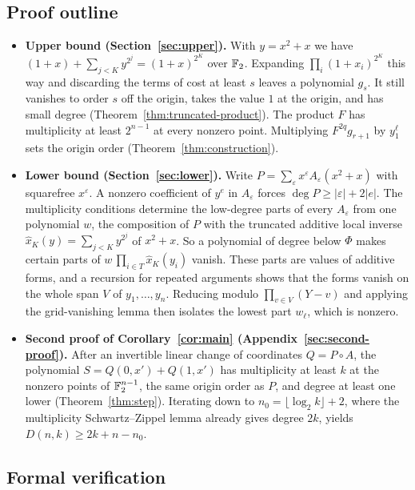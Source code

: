 \subsection{Proof outline}

\begin{itemize}
 \item \textbf{Upper bound (Section~\ref{sec:upper}).} With
 \(y=x^2+x\) we have \((1+x)+\sum_{j<K}y^{2^j}=(1+x)^{2^K}\) over \(\mathbb F_2\).
 Expanding \(\prod_i(1+x_i)^{2^K}\) this way and discarding the terms of
 cost at least \(s\) leaves a polynomial \(g_s\). It still vanishes to order
 \(s\) off the origin, takes the value \(1\) at the origin, and has small
 degree (Theorem~\ref{thm:truncated-product}). The product \(F\) has
 multiplicity at least \(2^{n-1}\) at every nonzero point. Multiplying
 \(F^{2q}g_{r+1}\) by \(y_1^\ell\) sets the origin order
 (Theorem~\ref{thm:construction}).
 \item \textbf{Lower bound (Section~\ref{sec:lower}).} Write
 \(P=\sum_\varepsilon x^\varepsilon A_\varepsilon(x^2+x)\) with squarefree
 \(x^\varepsilon\). A nonzero coefficient of \(y^e\) in \(A_\varepsilon\) forces
 \(\deg P\ge|\varepsilon|+2|e|\). The multiplicity conditions determine the
 low-degree parts of every \(A_\varepsilon\) from one polynomial \(w\), the
 composition of \(P\) with the truncated additive local inverse
 \(\hat x_K(y)=\sum_{j<K}y^{2^j}\) of \(x^2+x\). So a polynomial of degree below
 \(\Phi\) makes certain parts of \(w\,\prod_{i\in T}\hat x_K(y_i)\) vanish. These
 parts are values of additive forms, and a recursion for repeated arguments
 shows that the forms vanish on the whole span \(V\) of \(y_1,\ldots,y_n\).
 Reducing modulo \(\prod_{v\in V}(Y-v)\) and applying the grid-vanishing lemma
 then isolates the lowest part \(w_\ell\), which is nonzero.
 \item \textbf{Second proof of Corollary~\ref{cor:main}
 (Appendix~\ref{sec:second-proof}).} After an invertible linear change of
 coordinates \(Q=P\circ A\), the polynomial \(S=Q(0,x')+Q(1,x')\) has
 multiplicity at least \(k\) at the nonzero points of \(\mathbb F_2^{n-1}\), the same
 origin order as \(P\), and degree at least one lower (Theorem~\ref{thm:step}).
 Iterating down to \(n_0=\lfloor\log_2k\rfloor+2\), where the multiplicity
 Schwartz--Zippel lemma already gives degree \(2k\), yields
 \(D(n,k)\ge2k+n-n_0\).
\end{itemize}

\subsection{Formal verification}

